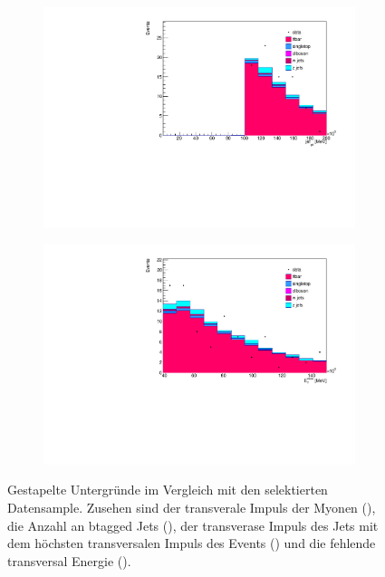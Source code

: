 \begin{figure}[H]
\begin{subfigure}{0.5\textwidth}
    \includegraphics[width=\linewidth]{plots_and_txt/stacked_plots/stacked_jet_pt.pdf}
    \caption{}
    \label{fig:stacked_jet_pt_good}
  \end{subfigure}%
  \begin{subfigure}{0.5\textwidth}
    \centering
    \includegraphics[width=\linewidth]{plots_and_txt/stacked_plots/stacked_met_et.pdf}
    \caption{}
    \label{fig:stacked_met_et}
  \end{subfigure}%
  \caption{Gestapelte Untergründe im Vergleich mit den selektierten Datensample. 
  Zusehen sind der transverale Impuls der Myonen (), 
  die Anzahl an btagged Jets (), 
  der transverase Impuls des Jets mit dem höchsten transversalen Impuls des Events () und die fehlende transversal Energie ().
  }
  \label{fig:stackedex}
\end{figure}


